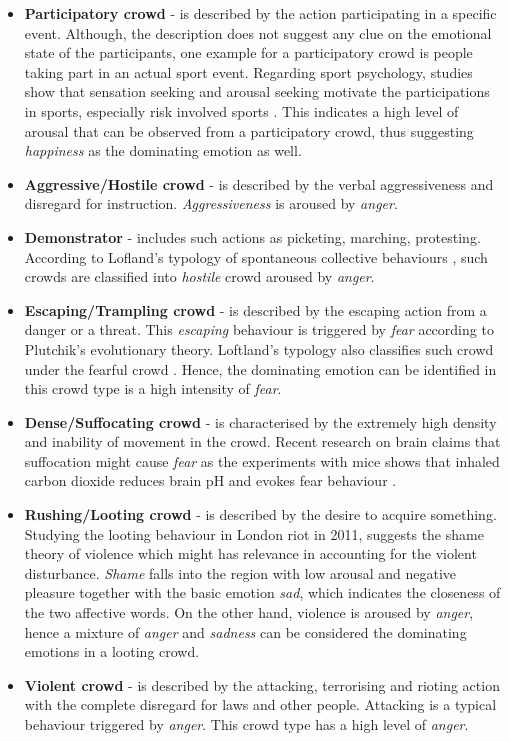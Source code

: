 \begin{itemize}
\item \textbf{Participatory crowd} - is described by the action participating in a specific event. Although, the description does not suggest any clue on the emotional state of the participants, one example for a participatory crowd is people taking part in an actual sport event. Regarding sport psychology, studies show that sensation seeking and arousal seeking motivate the participations in sports, especially risk involved sports \citep{rowland1986sensation}. This indicates a high level of arousal that can be observed from a participatory crowd, thus suggesting \textit{happiness} as the dominating emotion as well.

\item \textbf{Aggressive/Hostile crowd} - is described by the verbal aggressiveness and disregard for instruction. \textit{Aggressiveness} is aroused by \textit{anger}.

\item \textbf{Demonstrator} - includes such actions as picketing, marching, protesting. According to Lofland's typology of spontaneous collective behaviours \citep{Kornblum2011}, such crowds are classified into \textit{hostile} crowd aroused by \textit{anger}.

\item \textbf{Escaping/Trampling crowd} - is described by the escaping action from a danger or a threat. This \textit{escaping} behaviour is triggered by \textit{fear} according to Plutchik's evolutionary theory. Loftland's typology also classifies such crowd under the fearful crowd \cite{Kornblum2011}. Hence, the dominating emotion can be identified in this crowd type is a high intensity of \textit{fear}.

\item \textbf{Dense/Suffocating crowd} - is characterised by the extremely high density and inability of movement in the crowd. Recent research on brain claims that suffocation might cause \textit{fear} as the experiments with mice shows that inhaled carbon dioxide reduces brain pH and evokes fear behaviour \citep{ziemann2009amygdala}.

\item \textbf{Rushing/Looting crowd} - is described by the desire to acquire something. Studying the looting behaviour in London riot in 2011, \citet{ray2014shame} suggests the shame theory of violence which might has relevance in accounting for the violent disturbance. \textit{Shame} falls into the region with low arousal and negative pleasure together with the basic emotion \textit{sad}, which indicates the closeness of the two affective words. On the other hand, violence is aroused by \textit{anger}, hence a mixture of \textit{anger} and \textit{sadness} can be considered the dominating emotions in a looting crowd.

\item \textbf{Violent crowd} - is described by the attacking, terrorising and rioting action with the complete disregard for laws and other people. Attacking is a typical behaviour triggered by \textit{anger}. This crowd type has a high level of \textit{anger}.
\end{itemize}

